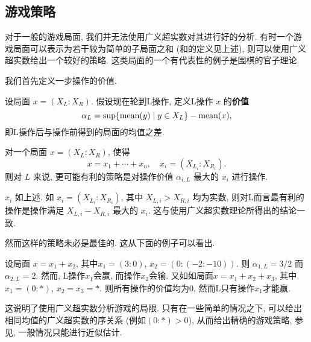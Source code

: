 \subsection{游戏策略}
对于一般的游戏局面, 我们并无法使用广义超实数对其进行好的分析. 有时一个游戏局面可以表示为若干较为简单的子局面之和 (和的定义见上述), 则可以使用广义超实数给出一个较好的策略. 这类局面的一个有代表性的例子是围棋的官子理论.

我们首先定义一步操作的价值.
\begin{definition}
  设局面 $x=(X_L:X_R)$. 假设现在轮到L操作, 定义L操作 $x$ 的\textbf{价值}
  \[
    \alpha_{L}=\sup\{\operatorname{mean}(y)\mid y\in X_L\}-\operatorname{mean}(x),
  \]
  即L操作后与操作前得到的局面的均值之差.
\end{definition}
对一个局面 $x=(X_L:X_R)$, 
使得
\[
  x=x_1+\cdots+x_n,\quad x_i=(X_{L_i}:X_{R_i}).
\]
则对 $L$ 来说, 更可能有利的策略是对操作价值 $\alpha_{i,L}$ 最大的 $x_i$ 进行操作.
\begin{example}
  $x_i$ 如上述. 如 $x_i=(X_{L_i}:X_{R_i})$, 其中 $X_{L,i}>X_{R,i}$ 均为实数, 则对L而言最有利的操作是操作满足 $X_{L,i}-X_{R,i}$ 最大的 $x_i$. 这与使用广义超实数理论所得出的结论一致.
\end{example}
然而这样的策略未必是最佳的. 这从下面的例子可以看出.
\begin{example}
  设局面 $x=x_1+x_2$, 其中$x_1=(3:0)$, $x_2=(0:(-2:-10))$. 则 $\alpha_{1,L}=3/2$ 而 $\alpha_{2,L}=2$. 然而, L操作$x_1$会赢, 而操作$x_2$会输. 又如如局面$x=x_1+x_2+x_3$, 其中$x_1=(0:*)$, $x_2=x_3=*$. 则所有操作的价值均为$0$, 然而L只有操作$x_1$才能赢.
\end{example}
这说明了使用广义超实数分析游戏的局限. 只有在一些简单的情况之下, 可以给出相同均值的广义超实数的序关系 (例如$(0:*)>0$), 从而给出精确的游戏策略, 参见\cite{BW97}, 一般情况只能进行近似估计.